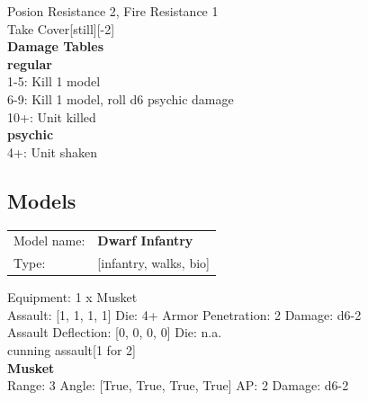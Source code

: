 Posion Resistance 2, Fire Resistance 1\\ 
Take Cover[still][-2]\\ 



{\bf Damage Tables} \\
 {\bf regular } \\
1-5: Kill 1 model \\
6-9: Kill 1 model, roll d6 psychic damage \\
10+: Unit killed \\
 {\bf psychic } \\
4+: Unit shaken \\


\clearpage

\subsection{ Models }

\begin{tabular}{ll}
Model name: & {\bf Dwarf Infantry } \\
Type: & [infantry, walks, bio] \\
\end{tabular}

Equipment: 1 x Musket \\

Assault: [1, 1, 1, 1] Die: 4+ Armor Penetration: 2 Damage: d6-2 \\
Assault Deflection: [0, 0, 0, 0] Die: n.a.\\
\indent cunning assault[1 for 2]\\ 
 



{\bf Musket } \\



Range: 3  Angle: [True, True, True, True] AP: 2 Damage: d6-2 \\




 















